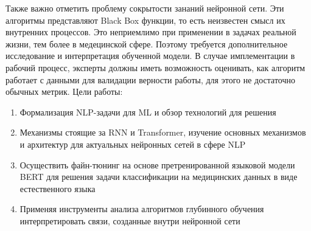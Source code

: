 \newline
Также важно отметить проблему сокрытости зананий нейронной сети. Эти алгоритмы представляют Black Box функции, то есть неизвестен смысл их внутренних процессов. Это неприемлимо при применении в задачах реальной жизни, тем более в медецинской сфере. Поэтому требуется дополнительное исследование и интерпретация обученной модели. В случае имплементации в рабочий процесс, эксперты должны иметь возможность оценивать, как алгоритм работает с данными для валидации верности работы, для этого не достаточно обычных метрик.
\newline
Цели работы:
\begin{enumerate}
\item  Формализация NLP-задачи для ML и обзор технологий для решения
\item  Механизмы стоящие за RNN и Transformer, изучение основных механизмов и архитектур для актуальных нейронных сетей в сфере NLP
\item  Осуществить файн-тюнинг на основе претренированной языковой модели BERT для решения задачи классификации на медицинских данных в виде естественного языка
\item  Применяя инструменты анализа алгоритмов глубинного обучения интерпретировать связи, созданные внутри нейронной сети
\end{enumerate}